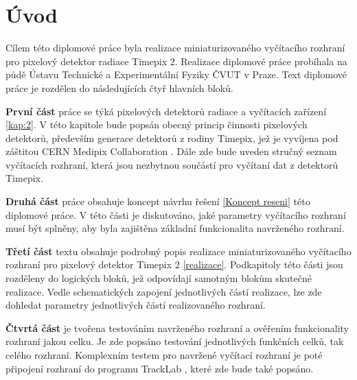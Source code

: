 \chapter{Úvod}



Cílem této diplomové práce byla realizace miniaturizovaného vyčítacího rozhraní pro pixelový detektor radiace Timepix 2. Realizace diplomové práce probíhala na půdě Ústavu Technické a Experimentální Fyziky ČVUT v Praze. Text diplomové práce je rozdělen do následujících čtyř hlavních bloků.

\par \textbf{První část} práce se týká pixelových detektorů radiace a vyčítacích zařízení \ref{kap:2}. V této kapitole bude popsán obecný princip činnosti pixelových detektorů, především generace detektorů z rodiny Timepix, jež je vyvíjena pod záštitou CERN Medipix Collaboration \cite{Medpix}. Dále zde bude uveden stručný seznam vyčítacích rozhraní, která jsou nezbytnou součástí pro vyčítaní dat z detektorů Timepix.

\par \textbf{Druhá část} práce obsahuje koncept návrhu řešení \ref{Koncept reseni} této diplomové práce. V této části je diskutováno, jaké parametry vyčítacího rozhraní musí být splněny, aby byla zajištěna základní funkcionalita navrženého rozhraní.

\par \textbf{Třetí část} textu obsahuje podrobný popis realizace miniaturizovaného vyčítacího rozhraní pro pixelový detektor Timepix 2 \ref{realizace}. Podkapitoly této části jsou rozděleny do logických bloků, jež odpovídají samotným blokům skutečné realizace. Vedle schematických zapojení jednotlivých částí realizace, lze zde dohledat parametry jednotlivých částí realizovaného rozhraní.

\par \textbf{Čtvrtá část} je tvořena testováním navrženého rozhraní a ověřením funkcionality rozhraní jakou celku. Je zde popsáno testování jednotlivých funkčních celků, tak celého rozhraní. Komplexním testem pro navržené vyčítací rozhraní je poté připojení rozhraní do programu TrackLab \cite{Manek_2024}, které zde bude také popsáno.